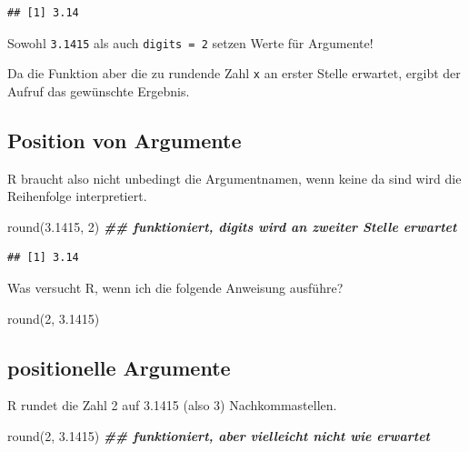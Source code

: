 \documentclass[
]{book}
\newenvironment{Shaded}{\begin{snugshade}}{\end{snugshade}}
\newcommand{\DecValTok}[1]{\textcolor[rgb]{0.00,0.00,0.81}{#1}}
\newcommand{\DocumentationTok}[1]{\textcolor[rgb]{0.56,0.35,0.01}{\textbf{\textit{#1}}}}
\newcommand{\FloatTok}[1]{\textcolor[rgb]{0.00,0.00,0.81}{#1}}
\newcommand{\FunctionTok}[1]{\textcolor[rgb]{0.00,0.00,0.00}{#1}}
\newcommand{\NormalTok}[1]{#1}
\begin{document}
\begin{verbatim}
## [1] 3.14
\end{verbatim}

Sowohl \texttt{3.1415} als auch \texttt{digits\ =\ 2} setzen Werte für Argumente!

Da die Funktion aber die zu rundende Zahl \texttt{x} an erster Stelle erwartet, ergibt der Aufruf das gewünschte Ergebnis.

\hypertarget{position-von-argumente}{%
\subsection{Position von Argumente}\label{position-von-argumente}}

R braucht also nicht unbedingt die Argumentnamen, wenn keine da sind wird die Reihenfolge interpretiert.

\begin{Shaded}
\begin{Highlighting}[]
\FunctionTok{round}\NormalTok{(}\FloatTok{3.1415}\NormalTok{, }\DecValTok{2}\NormalTok{) }\DocumentationTok{\#\# funktioniert, digits wird an zweiter Stelle erwartet}
\end{Highlighting}
\end{Shaded}

\begin{verbatim}
## [1] 3.14
\end{verbatim}

Was versucht R, wenn ich die folgende Anweisung ausführe?

\begin{Shaded}
\begin{Highlighting}[]
\FunctionTok{round}\NormalTok{(}\DecValTok{2}\NormalTok{, }\FloatTok{3.1415}\NormalTok{)}
\end{Highlighting}
\end{Shaded}

\hypertarget{positionelle-argumente}{%
\subsection{positionelle Argumente}\label{positionelle-argumente}}

R rundet die Zahl 2 auf 3.1415 (also 3) Nachkommastellen.

\begin{Shaded}
\begin{Highlighting}[]
\FunctionTok{round}\NormalTok{(}\DecValTok{2}\NormalTok{, }\FloatTok{3.1415}\NormalTok{) }\DocumentationTok{\#\# funktioniert, aber vielleicht nicht wie erwartet}
\end{Highlighting}
\end{Shaded}
\end{document}
